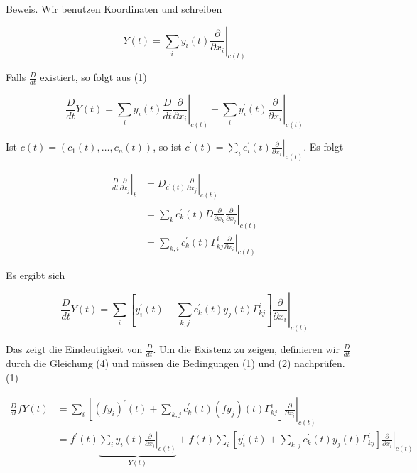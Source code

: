 \documentclass[10pt]{article}
\begin{document}
Beweis. Wir benutzen Koordinaten und schreiben

$$
Y(t)=\left.\sum_{i} y_{i}(t) \frac{\partial}{\partial x_{i}}\right|_{c(t)}
$$

Falls $\frac{D}{d t}$ existiert, so folgt aus (1)

$$
\frac{D}{d t} Y(t)=\left.\sum_{i} y_{i}(t) \frac{D}{d t} \frac{\partial}{\partial x_{i}}\right|_{c(t)}+\left.\sum_{i} y_{i}^{\prime}(t) \frac{\partial}{\partial x_{i}}\right|_{c(t)}
$$

Ist $c(t)=\left(c_{1}(t), \ldots, c_{n}(t)\right)$, so ist $c^{\prime}(t)=\left.\sum_{i} c_{i}^{\prime}(t) \frac{\partial}{\partial x_{i}}\right|_{c(t)}$. Es folgt

$$
\begin{aligned}
\left.\frac{D}{d t} \frac{\partial}{\partial x_{j}}\right|_{t} & =\left.D_{c^{\prime}(t)} \frac{\partial}{\partial x_{j}}\right|_{c(t)} \\
& =\left.\sum_{k} c_{k}^{\prime}(t) D \frac{\partial}{\partial x_{k}} \frac{\partial}{\partial x_{j}}\right|_{c(t)} \\
& =\left.\sum_{k, i} c_{k}^{\prime}(t) \Gamma_{k j}^{i} \frac{\partial}{\partial x_{i}}\right|_{c(t)}
\end{aligned}
$$

Es ergibt sich


\begin{equation*}
\frac{D}{d t} Y(t)=\left.\sum_{i}\left[y_{i}^{\prime}(t)+\sum_{k, j} c_{k}^{\prime}(t) y_{j}(t) \Gamma_{k j}^{i}\right] \frac{\partial}{\partial x_{i}}\right|_{c(t)} \tag{4}
\end{equation*}


Das zeigt die Eindeutigkeit von $\frac{D}{d t}$. Um die Existenz zu zeigen, definieren wir $\frac{D}{d t}$ durch die Gleichung (4) und müssen die Bedingungen (1) und (2) nachprüfen.\\
(1)

$$
\begin{aligned}
\frac{D}{d t} f Y(t) & =\left.\sum_{i}\left[\left(f y_{i}\right)^{\prime}(t)+\sum_{k, j} c_{k}^{\prime}(t)\left(f y_{j}\right)(t) \Gamma_{k j}^{i}\right] \frac{\partial}{\partial x_{i}}\right|_{c(t)} \\
& =f^{\prime}(t) \underbrace{\left.\sum_{i} y_{i}(t) \frac{\partial}{\partial x_{i}}\right|_{c(t)}}_{Y(t)}+\left.f(t) \sum_{i}\left[y_{i}^{\prime}(t)+\sum_{k, j} c_{k}^{\prime}(t) y_{j}(t) \Gamma_{k j}^{i}\right] \frac{\partial}{\partial x_{i}}\right|_{c(t)}
\end{aligned}
$$
\end{document}
